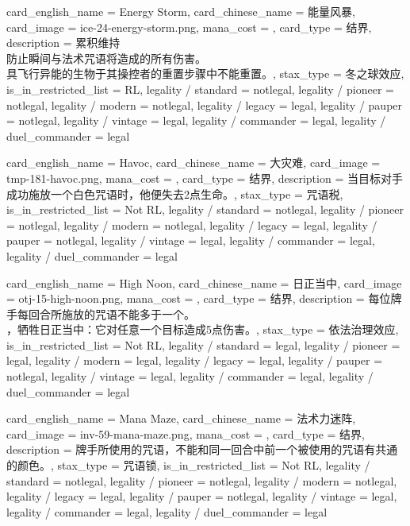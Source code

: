 \documentclass[lang = cn, color = black, 10pt]{AllThatStax}
\begin{document}
\card
{
	card_english_name = {Energy Storm},
	card_chinese_name = {能量风暴},
	card_image = ice-24-energy-storm.png,
	mana_cost = ,
	card_type = 结界,
	description = {累积维持\\
防止瞬间与法术咒语将造成的所有伤害。\\
具飞行异能的生物于其操控者的重置步骤中不能重置。},
	stax_type = 冬之球效应,
	is_in_restricted_list = RL,
	legality / standard = notlegal,
	legality / pioneer = notlegal,
	legality / modern = notlegal,
	legality / legacy = legal,
	legality / pauper = notlegal,
	legality / vintage = legal,
	legality / commander = legal,
	legality / duel_commander = legal
}

\card
{
	card_english_name = {Havoc},
	card_chinese_name = {大灾难},
	card_image = tmp-181-havoc.png,
	mana_cost = ,
	card_type = 结界,
	description = {当目标对手成功施放一个白色咒语时，他便失去2点生命。},
	stax_type = 咒语税,
	is_in_restricted_list = Not RL,
	legality / standard = notlegal,
	legality / pioneer = notlegal,
	legality / modern = notlegal,
	legality / legacy = legal,
	legality / pauper = notlegal,
	legality / vintage = legal,
	legality / commander = legal,
	legality / duel_commander = legal
}

\card
{
	card_english_name = {High Noon},
	card_chinese_name = {日正当中},
	card_image = otj-15-high-noon.png,
	mana_cost = ,
	card_type = 结界,
	description = {每位牌手每回合所施放的咒语不能多于一个。\\
，牺牲日正当中：它对任意一个目标造成5点伤害。},
	stax_type = 依法治理效应,
	is_in_restricted_list = Not RL,
	legality / standard = legal,
	legality / pioneer = legal,
	legality / modern = legal,
	legality / legacy = legal,
	legality / pauper = notlegal,
	legality / vintage = legal,
	legality / commander = legal,
	legality / duel_commander = legal
}

\card
{
	card_english_name = {Mana Maze},
	card_chinese_name = {法术力迷阵},
	card_image = inv-59-mana-maze.png,
	mana_cost = ,
	card_type = 结界,
	description = {牌手所使用的咒语，不能和同一回合中前一个被使用的咒语有共通的颜色。},
	stax_type = 咒语锁,
	is_in_restricted_list = Not RL,
	legality / standard = notlegal,
	legality / pioneer = notlegal,
	legality / modern = notlegal,
	legality / legacy = legal,
	legality / pauper = notlegal,
	legality / vintage = legal,
	legality / commander = legal,
	legality / duel_commander = legal
}
\end{document}
